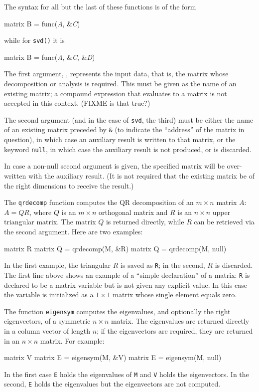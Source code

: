The syntax for all but the last of these functions is of the form
%
\begin{textcode}
matrix B = func(\textsl{A}, \&\textsl{C})
\end{textcode}
%
while for \texttt{svd()} it is
%
\begin{textcode}
matrix B = func(\textsl{A}, \&\textsl{C}, \&\textsl{D})
\end{textcode}
%
The first argument, , represents the input data, that is, the
matrix whose decomposition or analysis is required.  This must be
given as the name of an existing matrix; a compound expression that
evaluates to a matrix is not accepted in this context. (FIXME is that
true?)

The second argument (and in the case of \texttt{svd}, the third) must
be either the name of an existing matrix preceded by \verb+&+ (to
indicate the ``address'' of the matrix in question), in which case an
auxiliary result is written to that matrix, or the keyword
\texttt{null}, in which case the auxiliary result is not produced, or
is discarded.

In case a non-null second argument is given, the specified matrix will
be over-written with the auxiliary result.  (It is not required that
the existing matrix be of the right dimensions to receive the result.)

The \texttt{qrdecomp} function computes the QR decomposition of an $m
\times n$ matrix $A$: $A = QR$, where $Q$ is an $m \times n$
orthogonal matrix and $R$ is an $n \times n$ upper triangular matrix.
The matrix $Q$ is returned directly, while $R$ can be retrieved via
the second argument.  Here are two examples:
%
\begin{code}
matrix R
matrix Q = qrdecomp(M, &R)
matrix Q = qrdecomp(M, null)
\end{code}
%
In the first example, the triangular $R$ is saved as \texttt{R}; in
the second, $R$ is discarded.  The first line above shows an example
of a ``simple declaration'' of a matrix: \texttt{R} is
declared to be a matrix variable but is not given any explicit value.
In this case the variable is initialized as a $1\times 1$ matrix whose
single element equals zero.

The function \texttt{eigensym} computes the eigenvalues, and
optionally the right eigenvectors, of a symmetric $n \times n$ matrix.
The eigenvalues are returned directly in a column vector of length
$n$; if the eigenvectors are required, they are returned in an $n
\times n$ matrix.  For example:
%
\begin{code}
matrix V
matrix E = eigensym(M, &V)
matrix E = eigensym(M, null)
\end{code}
%
In the first case \texttt{E} holds the eigenvalues of \texttt{M} and
\texttt{V} holds the eigenvectors.  In the second, \texttt{E} holds
the eigenvalues but the eigenvectors are not computed.

